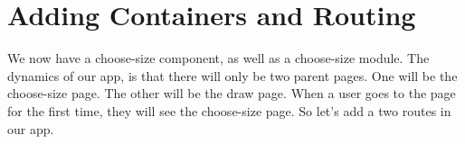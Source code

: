 \maketitle{}
\section{ Adding Containers and Routing }

We now have a choose-size component, as well as a choose-size module.
The dynamics of our app, is that there will only be two parent pages. One will
be the choose-size page. The other will be the draw page. When a user goes to
the page for the first time, they will see the choose-size page. So let's add a
two routes in our app.
